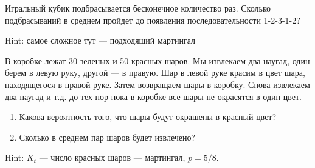 \begin{problem}
Игральный кубик подбрасывается бесконечное количество раз. Сколько подбрасываний в среднем пройдет до появления последовательности 1-2-3-1-2? 
\end{problem} 
\begin{solution} 

Hint: самое сложное тут --- подходящий мартингал 
\end{solution}

\begin{problem}
В коробке лежат 30 зеленых и 50 красных шаров. Мы извлекаем два наугад, один берем в левую руку, другой --- в правую. Шар в левой руке красим в цвет шара, находящегося в правой руке. Затем возвращаем шары в коробку. Снова извлекаем два наугад и т.д. до тех пор пока в коробке все шары не окрасятся в один цвет. 
\begin{enumerate}
\item  Какова вероятность того, что шары будут окрашены в красный цвет? 
\item  Сколько в среднем пар шаров будет извлечено? 
\end{enumerate}

\end{problem} 
\begin{solution} 

Hint: $K_{t}$ --- число красных шаров --- мартингал, $p=5/8$. 
\end{solution}





